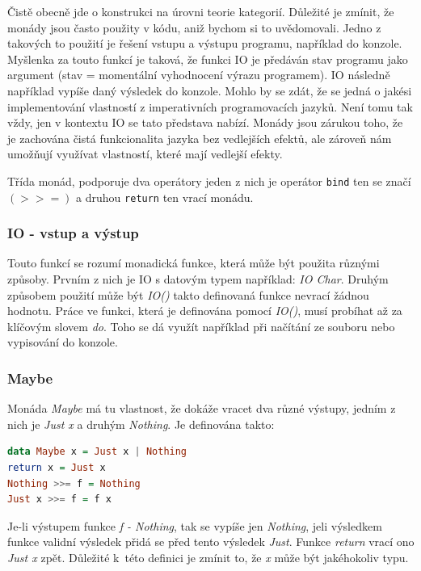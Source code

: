 \documentclass[12pt,a4paper]{report}
\begin{document}
Čistě obecně jde o konstrukci na úrovni teorie kategorií. Důležité je zmínit, že monády jsou často použity v kódu, aniž bychom si to uvědomovali. Jedno z takových to použití je řešení vstupu a výstupu programu, například do konzole. Myšlenka za touto funkcí je taková, že funkci IO je předáván stav programu jako argument (stav = momentální vyhodnocení výrazu programem). IO následně například vypíše daný výsledek do konzole. Mohlo by se zdát, že se jedná o jakési implementování vlastností z imperativních programovacích jazyků. Není tomu tak vždy, jen v kontextu IO se tato představa nabízí. Monády jsou zárukou toho, že je zachována čistá funkcionalita jazyka bez vedlejších efektů, ale zároveň nám umožňují využívat vlastností, které mají vedlejší efekty. 

Třída monád, podporuje dva operátory jeden z nich je operátor \texttt{bind} ten se značí $ (>>=) $ a druhou \texttt{return} ten vrací monádu. 
\subsubsection{IO - vstup a výstup}
Touto funkcí se rozumí monadická funkce, která může být použita různými způsoby. Prvním z nich je IO s datovým typem například: \textit{IO Char}. Druhým způsobem použití může být \textit{IO()} takto definovaná funkce nevrací žádnou hodnotu. Práce ve funkci, která je definována pomocí \textit{IO()}, musí probíhat až za klíčovým slovem \textit{do}. Toho se dá využít například při načítání ze souboru nebo vypisování do konzole.  

\subsubsection{Maybe}
Monáda \textit{Maybe} má tu vlastnost, že dokáže vracet dva různé výstupy, jedním z nich je \textit{Just x} a druhým \textit{Nothing}. Je definována takto:

\begin{lstlisting}[language=Haskell, caption={Definice Maybe}, captionpos=b,]
data Maybe x = Just x | Nothing
return x = Just x
Nothing >>= f = Nothing	
Just x >>= f = f x
\end{lstlisting}
Je-li výstupem funkce \textit{f - Nothing}, tak se vypíše jen \textit{Nothing}, jeli výsledkem funkce validní výsledek přidá se před tento výsledek \textit{Just}. Funkce \textit{return} vrací ono \textit{Just x} zpět.\cite{monady} Důležité k~této definici je zmínit to, že \textit{x} může být jakéhokoliv typu.  
\end{document}

